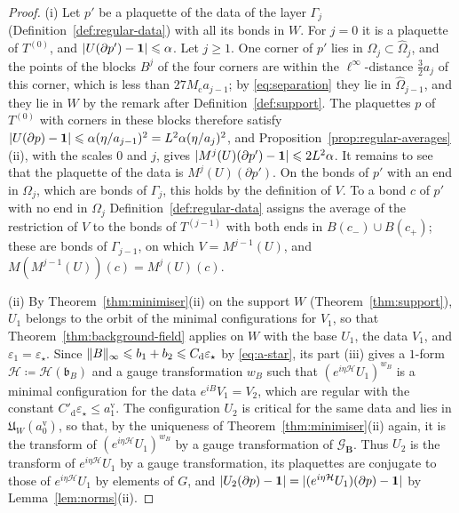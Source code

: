 \documentclass[11pt]{preprint}
\newcommand{\id}{\mathbf 1}
\DeclarePairedDelimiter{\abs}{\lvert}{\rvert}
\DeclarePairedDelimiter{\norm}{\lVert}{\rVert}
\numberwithin{equation}{section}
\begin{document}
\begin{proof}
(i) Let $p'$ be a plaquette of the data of the layer $\Gamma_j$ (Definition~\ref{def:regular-data}) with all its bonds in $W$. For $j = 0$ it is a plaquette of $T^{(0)}$, and $\abs{U(\partial p') - \id} \leqslant \alpha$. Let $j \geqslant 1$. One corner of $p'$ lies in $\Omega_j \subset \hat\Omega_j$, and the points of the blocks $B^j$ of the four corners are within the $\ell^\infty$-distance $\frac{3}{2}a_j$ of this corner, which is less than $27M_{\mathrm c}a_{j-1}$; by \eqref{eq:separation} they lie in $\hat\Omega_{j-1}$, and they lie in $W$ by the remark after Definition~\ref{def:support}. The plaquettes $p$ of $T^{(0)}$ with corners in these blocks therefore satisfy $\abs{U(\partial p) - \id} \leqslant \alpha(\eta/a_{j-1})^2 = L^2\alpha(\eta/a_j)^2$, and Proposition~\ref{prop:regular-averages}(ii), with the scales $0$ and $j$, gives $\abs{M^j(U)(\partial p') - \id} \leqslant 2L^2\alpha$. It remains to see that the plaquette of the data is $M^j(U)(\partial p')$. On the bonds of $p'$ with an end in $\Omega_j$, which are bonds of $\Gamma_j$, this holds by the definition of $V$. To a bond $c$ of $p'$ with no end in $\Omega_j$ Definition~\ref{def:regular-data} assigns the average of the restriction of $V$ to the bonds of $T^{(j-1)}$ with both ends in $B(c_-) \cup B(c_+)$; these are bonds of $\Gamma_{j-1}$, on which $V = M^{j-1}(U)$, and $M(M^{j-1}(U))(c) = M^j(U)(c)$.

(ii) By Theorem~\ref{thm:minimiser}(ii) on the support $W$ (Theorem~\ref{thm:support}), $U_1$ belongs to the orbit of the minimal configurations for $V_1$, so that Theorem~\ref{thm:background-field} applies on $W$ with the base $U_1$, the data $V_1$, and $\varepsilon_1 = \varepsilon_\star$. Since $\norm B_\infty \leqslant b_1 + b_2 \leqslant C_{\mathrm d}\varepsilon_\star$ by \eqref{eq:a-star}, its part (iii) gives a $1$-form $\mathcal H \coloneqq \mathcal H(\mathfrak b_B)$ and a gauge transformation $w_B$ such that $(e^{i\eta\mathcal H}U_1)^{w_B}$ is a minimal configuration for the data $e^{iB}V_1 = V_2$, which are regular with the constant $C'_{\mathrm d}\varepsilon_\star \leqslant a^{\mathrm v}_1$. The configuration $U_2$ is critical for the same data and lies in $\mathfrak U_W(a^{\mathrm v}_0)$, so that, by the uniqueness of Theorem~\ref{thm:minimiser}(ii) again, it is the transform of $(e^{i\eta\mathcal H}U_1)^{w_B}$ by a gauge transformation of $\mathcal G_{\mathbf B}$. Thus $U_2$ is the transform of $e^{i\eta\mathcal H}U_1$ by a gauge transformation, its plaquettes are conjugate to those of $e^{i\eta\mathcal H}U_1$ by elements of $G$, and $\abs{U_2(\partial p) - \id} = \abs{(e^{i\eta\mathcal H}U_1)(\partial p) - \id}$ by Lemma~\ref{lem:norms}(ii).


\end{proof}
\end{document}
